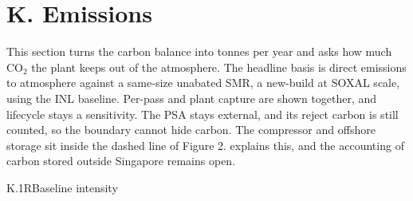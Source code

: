 \providecommand{\cBkAnnual}{44{,}476}
\providecommand{\cBkE}{3.77}
\providecommand{\cBkTerm}{3.19}
\providecommand{\cChoPct}{1.8}
\providecommand{\cChoProc}{6.08}
\providecommand{\cCmpAbate}{0.536}
\providecommand{\cEfeed}{5.97}
\providecommand{\cEst}{5.46}
\providecommand{\cIeaBase}{8.996}
\providecommand{\cIeaFuel}{14.2}
\providecommand{\cInlCcCap}{71.5}
\providecommand{\vAbAbove}{328{,}052}
\providecommand{\vAbAvA}{0.442}
\providecommand{\vAbAvB}{0.510}
\providecommand{\vAbAvC}{0.578}
\providecommand{\vAbAvD}{0.612}
\providecommand{\vAbBurden}{0.566}
\providecommand{\vAbCapEight}{0.564}
\providecommand{\vAbCapHigh}{0.584}
\providecommand{\vAbCapLow}{0.571}
\providecommand{\vAbCho}{0.587}
\providecommand{\vAbCombH}{0.467}
\providecommand{\vAbCombN}{0.357}
\providecommand{\vAbExport}{0.467}
\providecommand{\vAbIea}{0.564}
\providecommand{\vAbLife}{0.616}
\providecommand{\vAbSystem}{0.528}
\providecommand{\vAbateMt}{0.578}
\providecommand{\vBkCc}{29{,}017}
\providecommand{\vBkHours}{1{,}314}
\providecommand{\vBkHtwo}{11{,}810}
\providecommand{\vBkNo}{108{,}770}
\providecommand{\vEcapB}{359{,}777}
\providecommand{\vImpB}{0.0}
\providecommand{\vIntensity}{0.572}
\providecommand{\vReduction}{93.8}
\section{K. Emissions}\label{sec:K}
This section turns the carbon balance into tonnes per year and asks how much CO$_2$ the plant keeps out of the atmosphere. The headline basis is direct emissions to atmosphere against a same-size unabated SMR, a new-build at SOXAL scale, using the INL baseline. Per-pass and plant capture are shown together, and lifecycle stays a sensitivity. The PSA stays external, and its reject carbon is still counted, so the boundary cannot hide carbon. The compressor and offshore storage sit inside the dashed line of Figure 2.  explains this, and the accounting of carbon stored outside Singapore remains open.

\begin{eqcard}{K.1}{R}{Baseline intensity}
\end{eqcard}

